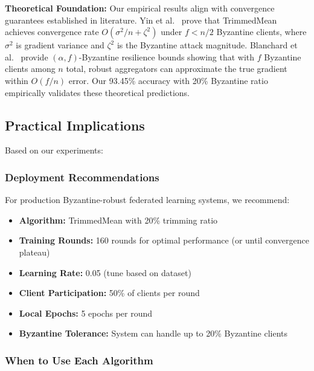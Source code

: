 \documentclass[12pt,a4paper,onecolumn]{article}
\begin{document}
\textbf{Theoretical Foundation:} Our empirical results align with convergence guarantees established in literature. Yin et al.~\cite{yin2018byzantine} prove that TrimmedMean achieves convergence rate $O(\sigma^2/n + \zeta^2)$ under $f < n/2$ Byzantine clients, where $\sigma^2$ is gradient variance and $\zeta^2$ is the Byzantine attack magnitude. Blanchard et al.~\cite{blanchard2017machine} provide $(\alpha, f)$-Byzantine resilience bounds showing that with $f$ Byzantine clients among $n$ total, robust aggregators can approximate the true gradient within $O(f/n)$ error. Our 93.45\% accuracy with 20\% Byzantine ratio empirically validates these theoretical predictions.

\subsection{Practical Implications}

Based on our experiments:

\subsubsection{Deployment Recommendations}

For production Byzantine-robust federated learning systems, we recommend:
\begin{itemize}
    \item \textbf{Algorithm:} TrimmedMean with 20\% trimming ratio
    \item \textbf{Training Rounds:} 160 rounds for optimal performance (or until convergence plateau)
    \item \textbf{Learning Rate:} 0.05 (tune based on dataset)
    \item \textbf{Client Participation:} 50\% of clients per round
    \item \textbf{Local Epochs:} 5 epochs per round
    \item \textbf{Byzantine Tolerance:} System can handle up to 20\% Byzantine clients
\end{itemize}

\subsubsection{When to Use Each Algorithm}
\end{document}
